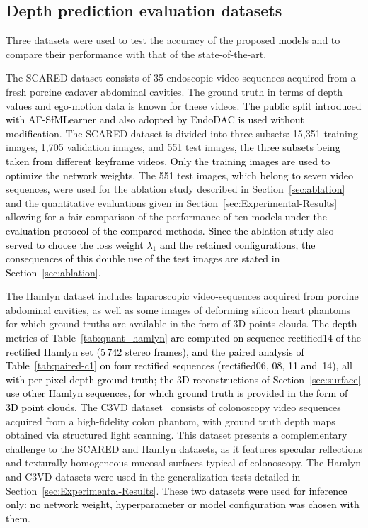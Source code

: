 \documentclass[a4paper,fleqn]{cas-dc}
\begin{document}
\subsection{Depth prediction evaluation datasets}
Three datasets were used to test the accuracy of the proposed models and to compare their performance with that of the state-of-the-art. 

The SCARED dataset consists of 35 endoscopic video-sequences acquired from a fresh porcine cadaver abdominal cavities. The ground truth in terms of depth values and ego-motion data is known for these videos. \textcolor{black}{The public split introduced with AF-SfMLearner \citep{Shao_MIA_2022} and also adopted by EndoDAC \citep{EndoDAC_MICCAI_2024} is used without modification.} The SCARED dataset is divided into three subsets: 15,351 training images, 1,705 validation images, and 551 test images\textcolor{black}{, the three subsets being taken from different keyframe videos. Only the training images are used to optimize the network weights.} The 551 test images\textcolor{black}{, which belong to seven video sequences,} were used for the ablation study described in Section~\ref{sec:ablation} and the quantitative evaluations given in Section~\ref{sec:Experimental-Results} allowing for a fair comparison of the performance of ten models\textcolor{black}{ under the evaluation protocol of the compared methods. Since the ablation study also served to choose the loss weight $\lambda_1$ and the retained configurations, the consequences of this double use of the test images are stated in Section~\ref{sec:ablation}.}


The Hamlyn dataset \citep{Recasens_IEEERAL_2021} includes laparoscopic video-sequences acquired from porcine abdominal cavities, as well as some images of deforming silicon heart phantoms for which ground truths are available in the form of 3D points clouds. \textcolor{black}{ The depth metrics of Table~\ref{tab:quant_hamlyn} are computed on sequence rectified14 of the rectified Hamlyn set (5\,742 stereo frames), and the paired analysis of Table~\ref{tab:paired-c1} on four rectified sequences (rectified06, 08, 11 and~14), all with per-pixel depth ground truth; the 3D reconstructions of Section~\ref{sec:surface} use other Hamlyn sequences, for which ground truth is provided in the form of 3D point clouds.} The C3VD dataset~\citep{bobrow2023colonoscopy} consists of colonoscopy video sequences acquired from a 
high-fidelity colon phantom, with ground truth depth maps obtained via structured light scanning. This dataset presents a complementary challenge to the SCARED and Hamlyn datasets, as it features specular reflections and texturally homogeneous mucosal surfaces typical of colonoscopy. The Hamlyn and C3VD datasets were used in the generalization tests detailed in Section~\ref{sec:Experimental-Results}. \textcolor{black}{These two datasets were used for inference only: no network weight, hyperparameter or model configuration was chosen with them.} 
\end{document}
